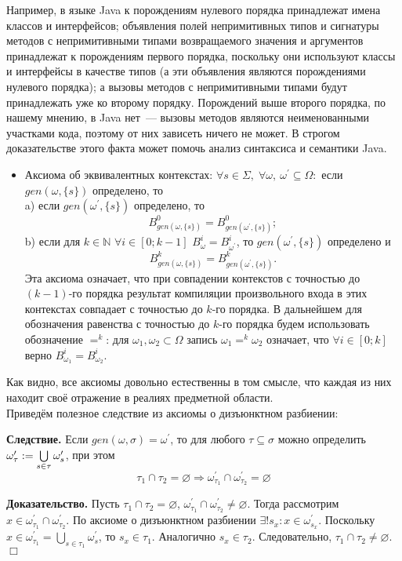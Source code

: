 Например, в языке Java к порождениям нулевого порядка принадлежат имена классов и интерфейсов; объявления полей непримитивных типов и сигнатуры методов с непримитивными типами возвращаемого значения и аргументов принадлежат к порождениям первого порядка, поскольку они используют классы и интерфейсы в качестве типов (а эти объявления являются порождениями нулевого порядка); а вызовы методов с непримитивными типами будут принадлежать уже ко второму порядку. Порождений выше второго порядка, по нашему мнению, в Java нет~--- вызовы методов являются неименованными участками кода, поэтому от них зависеть ничего не может. В строгом доказательстве этого факта может помочь анализ синтаксиса и семантики Java.

\begin{itemize}	
	\item Аксиома об эквивалентных контекстах: $\forall s \in \Sigma,\; \forall \omega,\: \omega^\prime \subseteq \Omega:$ если $gen(\omega, \{s\})$ определено, то\\
	a) если $gen(\omega^\prime, \{s\})$ определено, то $$B^0_{gen(\omega, \{s\})} = B^0_{gen(\omega^\prime, \{s\})};$$
	b) если для $k \in \mathbb{N}$ $\forall i \in [0; k-1]$ $B^i_{\omega} = B^i_{\omega^\prime}$, то $gen(\omega^\prime, \{s\})$ определено и $$B^k_{gen(\omega, \{s\})} = B^k_{gen(\omega^\prime, \{s\})}.$$
	Эта аксиома означает, что при совпадении контекстов с точностью до $(k-1)$-го порядка результат компиляции произвольного входа в этих контекстах совпадает с точностью до $k$-го порядка. В дальнейшем для обозначения равенства с точностью до $k$-го порядка будем использовать обозначение $=^k$: для $\omega_1, \omega_2 \subset \Omega$ запись $\omega_1 =^k \omega_2$ означает, что $\forall i \in [0; k]$ верно $B^i_{\omega_1} = B^i_{\omega_2}$.
\end{itemize}

Как видно, все аксиомы довольно естественны в том смысле, что каждая из них находит своё отражение в реалиях предметной области.\\

Приведём полезное следствие из аксиомы о дизъюнктном разбиении:

\textbf{Следствие.}
Если $gen(\omega, \sigma) = \omega^\prime$, то для любого $\tau \subseteq \sigma$ можно определить $\omega^\prime_\tau := \bigcup\limits_{s\in\tau}\omega^\prime_s$, при этом
$$\tau_1 \cap \tau_2 = \varnothing \Rightarrow \omega^\prime_{\tau_1} \cap \omega^\prime_{\tau_2} = \varnothing$$

\textbf{Доказательство.} Пусть $\tau_1 \cap \tau_2 = \varnothing$, $\omega^\prime_{\tau_1} \cap \omega^\prime_{\tau_2} \neq \varnothing$. Тогда рассмотрим $x \in \omega^\prime_{\tau_1} \cap \omega^\prime_{\tau_2}$. По аксиоме о дизъюнктном разбиении $\exists ! s_x: x \in \omega^\prime_{s_x}$. Поскольку $x \in \omega^\prime_{\tau_1} = \bigcup\limits_{s\in\tau_1}\omega^\prime_s$, то $s_x \in \tau_1$. Аналогично $s_x \in \tau_2$. Следовательно, $\tau_1 \cap \tau_2 \neq \varnothing$. $\Box$\\

